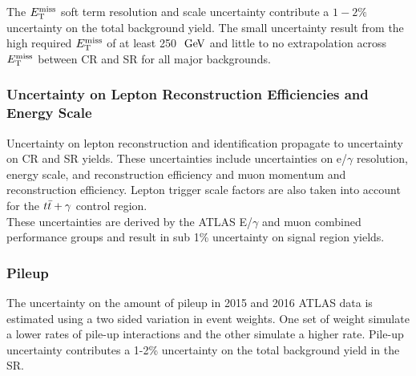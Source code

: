 \indent The $E_{\mathrm{T}}^{\mathrm{miss}}$ soft term resolution and scale uncertainty contribute a $1-2\%$ uncertainty on the total background yield.  The small uncertainty result from the high required $E_{\mathrm{T}}^{\mathrm{miss}}$ of at least 250 $\gev$ and little to no extrapolation across $E_{\mathrm{T}}^{\mathrm{miss}}$ between CR and SR for all major backgrounds. \\

\subsubsection*{Uncertainty on Lepton Reconstruction Efficiencies and Energy Scale}

\indent Uncertainty on lepton reconstruction and identification propagate to uncertainty on CR and SR yields.  These uncertainties include uncertainties on e/$\gamma$ resolution, energy scale, and reconstruction efficiency and muon momentum and reconstruction efficiency.  Lepton trigger scale factors are also taken into account for the $t\bar{t}+\gamma$ control region. \\

\indent These uncertainties are derived by the ATLAS E/$\gamma$ and muon combined performance groups and result in sub 1\% uncertainty on signal region yields.\cite{MuonReco,EleID} \\

\subsubsection*{Pileup}

\indent The uncertainty on the amount of pileup in 2015 and 2016 ATLAS data is estimated using a two sided variation in event weights.  One set of weight simulate a lower rates of pile-up interactions and the other simulate a higher rate.  Pile-up uncertainty contributes a 1-2\% uncertainty on the total background yield in the SR.






